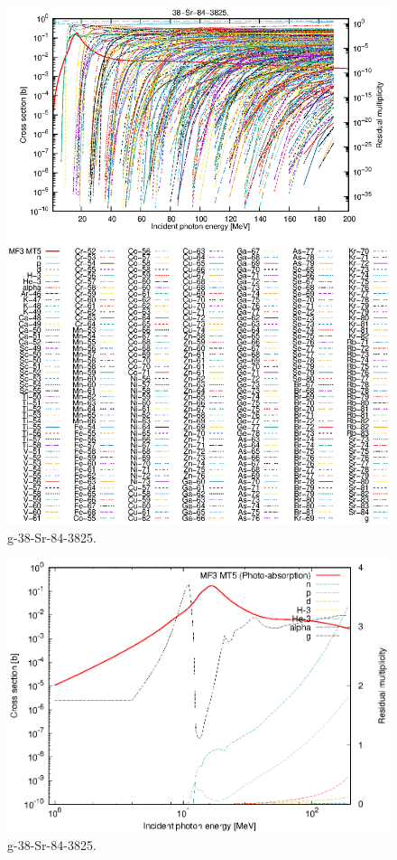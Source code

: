 \begin{figure}
 \includegraphics[width=\linewidth]{eps/g_38-Sr-84_3825.eps}
  \caption{g-38-Sr-84-3825.}
\end{figure}
\newpage \clearpage

\begin{figure}
 \includegraphics[width=\linewidth]{eps-log/g_38-Sr-84_3825.eps}
 \caption{g-38-Sr-84-3825.}
\end{figure}
\newpage \clearpage

